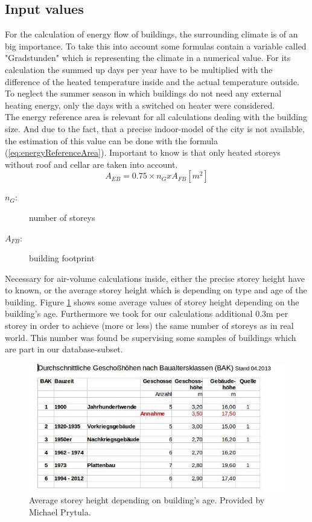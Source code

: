 \subsection{Input values}
For the calculation of energy flow of buildings, the surrounding climate is of an big importance. To take this into account some formulas contain a variable called "Gradstunden" which is representing the climate in a numerical value. For its calculation the summed up days per year have to be multiplied with the difference of the heated temperature inside and the actual temperature outside. To neglect the summer season in which buildings do not need any external heating energy, only the days with a switched on heater were considered.\\
The energy reference area is relevant for all calculations dealing with the building size. And due to the fact, that a precise indoor-model of the city is not available, the estimation of this value can be done with the formula (\ref{eq:energyReferenceArea}). Important to know is that only heated storeys without roof and cellar are taken into account.
\begin{equation}
	A_{EB} = 0.75 \times n_{G} x A_{FB} [m^2]
	\label{eq:energyReferenceArea}
\end{equation}
\begin{description}
	\item[$n_{G}$:] number of storeys
	\item[$A_{FB}$:] building footprint
\end{description}
Necessary for air-volume calculations inside, either the precise storey height have to known, or the average storey height which is depending on type and age of the building. Figure \ref{fig:storeyHeight} shows some average values of storey height depending on the building's age. Furthermore we took for our calculations additional 0.3m per storey in order to achieve (more or less) the same number of storeys as in real world. This number was found be supervising some samples of buildings which are part in our database-subset.
\begin{figure}[h]
	\centering
 	 \includegraphics[scale=0.5]{phase2/group1/storey_height.jpg} 
	\caption{Average storey height depending on building's age. Provided by Michael Prytula.}
	 \label{fig:storeyHeight}
\end{figure}
